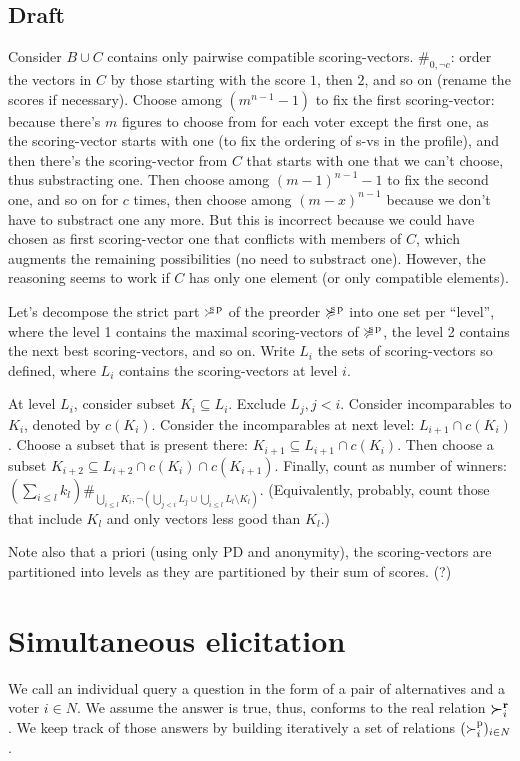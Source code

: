 \documentclass[version=last, pagesize, twoside=off, bibliography=totoc, DIV=calc, fontsize=14pt, a4paper, french, english]{scrartcl}
\begin{document}
\subsection{Draft}
Consider $B ∪ C$ contains only pairwise compatible scoring-vectors. $\#_{0, ¬c}$: order the vectors in $C$ by those starting with the score $1$, then $2$, and so on (rename the scores if necessary). Choose among $(m^{n-1} - 1)$ to fix the first scoring-vector: because there’s $m$ figures to choose from for each voter except the first one, as the scoring-vector starts with one (to fix the ordering of s-vs in the profile), and then there’s the scoring-vector from $C$ that starts with one that we can’t choose, thus substracting one. Then choose among $(m-1)^{n-1}-1$ to fix the second one, and so on for $c$ times, then choose among $(m-x)^{n-1}$ because we don’t have to substract one any more. But this is incorrect because we could have chosen as first scoring-vector one that conflicts with members of $C$, which augments the remaining possibilities (no need to substract one). However, the reasoning seems to work if $C$ has only one element (or only compatible elements).

Let’s decompose the strict part $\succ^\text{\!\!\!s\,p}$ of the preorder $\succcurlyeq^\text{\!\!\!s\,p}$ into one set per “level”, where the level 1 contains the maximal scoring-vectors of $\succcurlyeq^\text{\!\!\!s\,p}$, the level 2 contains the next best scoring-vectors, and so on. Write $L_i$ the sets of scoring-vectors so defined, where $L_i$ contains the scoring-vectors at level $i$. 

At level $L_i$, consider subset $K_i \subseteq L_i$. Exclude $L_j, j < i$. Consider incomparables to $K_i$, denoted by $c(K_i)$. Consider the incomparables at next level: $L_{i+1} ∩ c(K_i)$. Choose a subset that is present there: $K_{i + 1} \subseteq L_{i+1} ∩ c(K_i)$. Then choose a subset $K_{i + 2} \subseteq L_{i + 2} ∩ c(K_i) ∩ c(K_{i + 1})$. Finally, count as number of winners: $(\sum_{i ≤ l} k_l) \#_{\bigcup_{i ≤ l} K_i, ¬(\bigcup_{j < i} L_j ∪ \bigcup_{i ≤ l}L_l \setminus K_l)}$. (Equivalently, probably, count those that include $K_l$ and only vectors less good than $K_l$.)

Note also that a priori (using only PD and anonymity), the scoring-vectors are partitioned into levels as they are partitioned by their sum of scores. (?)

\section{Simultaneous elicitation}
We call an individual query a question in the form of a pair of alternatives and a voter $i \in N$. We assume the answer is true, thus, conforms to the real relation $\boldsymbol{\succ}^\textbf{r}_i$. We keep track of those answers by building iteratively a set of relations $(\succ_i^\text{p})_{i \in N}$.
\end{document}
